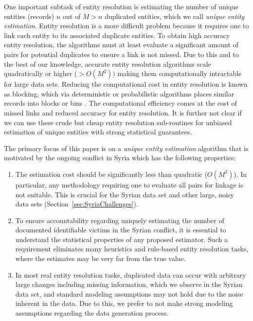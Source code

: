 \documentclass[aoas]{imsart}
\begin{document}
One important subtask of entity resolution is estimating the number of unique entities (records) $n$ out of $M > n$ duplicated entities, which we call \emph{unique entity estimation}. Entity resolution is a more difficult problem because it requires one to link each entity to its associated duplicate entities. To obtain high accuracy entity resolution, the algorithms must at least evaluate a significant amount of pairs for potential duplicates to ensure a link is not missed. Due to this and to the best of our knowledge, accurate entity resolution algorithms scale quadratically or higher ($> O(M^2))$ making them computationally intractable for large data sets.  Reducing the computational cost in entity resolution is known as blocking, which via deterministic or probabilistic algorithms places similar records into blocks or bins \citep{christen_2012, steorts14comparison}. The computational efficiency comes at the cost of missed links and reduced accuracy for entity resolution. It is further not clear if we can use these crude but cheap entity resolution sub-routines for unbiased estimation of unique entities with strong statistical guarantees.

The primary focus of this paper is on a \emph{unique entity estimation} algorithm that is motivated by the ongoing conflict in Syria which has the following properties:
\begin{enumerate}
  \item The estimation cost should be significantly less than quadratic ($O(M^2)$). In particular, any methodology requiring one to evaluate all pairs for linkage is not suitable. This is crucial for the Syrian data set and other large, noisy data sets (Section~\ref{sec:SyriaChallenges}).
  \item To ensure accountability regarding uniquely estimating the number of documented identifiable victims in the Syrian conflict, it is essential to understand the statistical properties of any proposed estimator. Such a requirement eliminates many heuristics and rule-based entity resolution tasks, where the estimates may be very far from the true value.
  \item  In most real entity resolution tasks, duplicated data can occur with arbitrary large changes including missing information, which we observe in the Syrian data set, and standard modeling assumptions may not hold due to the noise inherent in the data. Due to this, we prefer to not make strong modeling assumptions regarding the data generation process.
\end{enumerate}
\end{document}
